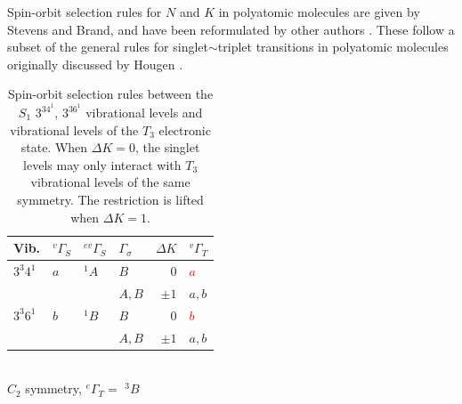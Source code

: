 \documentclass[12pt]{mitthesis}
\begin{document}
  Spin-orbit selection rules for $N$ and $K$ in
polyatomic molecules are given by Stevens and Brand, and have been
reformulated by other authors \cite{stevens73, howard78, dupre84}.
These follow a subset of the general rules for singlet$\sim$triplet
transitions in polyatomic molecules originally discussed by Hougen
\cite{hougen64}.




\begin{table}
  \caption{Spin-orbit selection rules between the $S_1$ $3^34^1$,
    $3^36^1$ vibrational levels and vibrational levels of the $T_3$
    electronic state.  When $\Delta K=0$, the singlet levels may only
    interact with $T_3$ vibrational levels of the same symmetry.  The
    restriction is lifted when $\Delta K=1$.
  }
  \label{table:delta-k}
  \centering
  \begin{tabular}{llllrl}
    Vib.
    & $^{v}\Gamma_S$ & $^{ev}\Gamma_S$ & $\Gamma_\sigma$ & $\Delta K$ & $^{v}\Gamma_T$ \\
    \toprule
    
    $3^3 4^1$ 
    & $a$ & $^{1}A$ & $B$ & $0$ & \textcolor{red}{$a$} \\
    & & & $A, B$ & $\pm1$ & $a, b$ \\[10pt]
    
    $3^3 6^1$ 
    & $b$ & $^{1}B$ & $B$ & $0$ & \textcolor{red}{$b$} \\
    & & & $A, B$ & $\pm1$ & $a, b$ \\
    
  \end{tabular}\\[5mm]
  
  $C_{2}$ symmetry, $^{e}\Gamma_T =$ $^{3}B$
\end{table}

\end{document}

